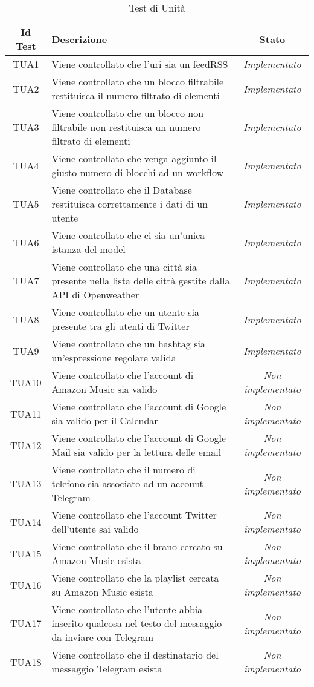 \normalsize
\begin{longtable}{|c|m{12em}|c|}
\hline 
\textbf{Id Test} & \textbf{Descrizione}  & \textbf{Stato}\\
\hline
\endhead

TUA1 & Viene controllato che l'uri sia un feedRSS  & \textit{Implementato}\\ \hline
TUA2 & Viene controllato che un blocco filtrabile restituisca il numero filtrato di elementi & \textit{Implementato}\\ \hline
TUA3 & Viene controllato che un blocco non filtrabile non restituisca un numero filtrato di elementi & \textit{Implementato}\\ \hline
TUA4 & Viene controllato che venga aggiunto il giusto numero di blocchi ad un workflow & \textit{Implementato}\\ \hline
TUA5 & Viene controllato che il Database restituisca correttamente i dati di un utente & \textit{Implementato}\\ \hline
TUA6 & Viene controllato che ci sia un'unica istanza del model & \textit{Implementato}\\ \hline
TUA7 & Viene controllato che una città sia presente nella lista delle città gestite dalla API di Openweather & \textit{Implementato}\\ \hline
TUA8 & Viene controllato che un utente sia presente tra gli utenti di Twitter & \textit{Implementato}\\ \hline
TUA9 & Viene controllato che un hashtag sia un'espressione regolare valida & \textit{Implementato}\\ \hline
TUA10 & Viene controllato che l'account di Amazon Music sia valido & \textit{Non implementato}\\ \hline
TUA11 & Viene controllato che l'account di Google sia valido per il Calendar & \textit{Non implementato}\\ \hline
TUA12 & Viene controllato che l'account di Google Mail sia valido per la lettura delle email & \textit{Non implementato}\\ \hline
TUA13 & Viene controllato che il numero di telefono sia associato ad un account Telegram & \textit{Non implementato}\\ \hline
TUA14 & Viene controllato che l'account Twitter dell'utente sai valido & \textit{Non implementato}\\ \hline
TUA15 & Viene controllato che il brano cercato su Amazon Music esista & \textit{Non implementato}\\ \hline
TUA16 & Viene controllato che la playlist cercata su Amazon Music esista & \textit{Non implementato}\\ \hline
TUA17 & Viene controllato che l'utente abbia inserito qualcosa nel testo del messaggio da inviare con Telegram & \textit{Non implementato}\\ \hline
TUA18 & Viene controllato che il destinatario del messaggio Telegram esista & \textit{Non implementato}\\ \hline
\caption[Test di Unità]{Test di Unità}
\label{tabella:test2}
\end{longtable}
\clearpage

